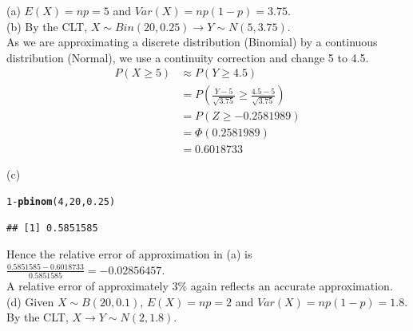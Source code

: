 \documentclass[bigtut]{tutorial}\usepackage[]{graphicx}\usepackage[]{color}
\makeatletter
\newcommand{\hlnum}[1]{\textcolor[rgb]{0.686,0.059,0.569}{#1}}%
\newcommand{\hlopt}[1]{\textcolor[rgb]{0,0,0}{#1}}%
\newcommand{\hlstd}[1]{\textcolor[rgb]{0.345,0.345,0.345}{#1}}%
\newcommand{\hlkwd}[1]{\textcolor[rgb]{0.737,0.353,0.396}{\textbf{#1}}}%
\newenvironment{kframe}{%
 \def\at@end@of@kframe{}%
 \ifinner\ifhmode%
  \def\at@end@of@kframe{\end{minipage}}%
  \begin{minipage}{\columnwidth}%
 \fi\fi%
 \def\FrameCommand##1{\hskip\@totalleftmargin \hskip-\fboxsep
 \colorbox{shadecolor}{##1}\hskip-\fboxsep
     \hskip-\linewidth \hskip-\@totalleftmargin \hskip\columnwidth}%
 \MakeFramed {\advance\hsize-\width
   \@totalleftmargin\z@ \linewidth\hsize
   \@setminipage}}%
 {\par\unskip\endMakeFramed%
 \at@end@of@kframe}
\newenvironment{knitrout}{}{} %
\makeatother
\begin{document}
\begin{tutorial}
\begin{questions}



\begin{solution}
(a)  $E(X) = np = 5$ and $Var(X)=np(1-p)=3.75$. \\

(b)
By the CLT, $X \sim Bin(20,0.25) \rightarrow Y \sim N(5,3.75)$. \\

As we are approximating a discrete distribution (Binomial) by a continuous distribution (Normal), we use a continuity correction and  change 5 to 4.5.
\begin{align*} 
P(X \geq 5) & \approx P(Y \geq 4.5) \\
& = P( \frac {Y - 5}{\sqrt{3.75}} \geq \frac{4.5-5}{\sqrt{3.75}} ) \\
& = P(Z \geq -0.2581989 ) \\
& = \Phi(0.2581989) \\
& = 0.6018733
\end{align*}

\vspace{.5cm}
(c)
\begin{knitrout}
\color{fgcolor}\begin{kframe}
\begin{alltt}
\hlnum{1}\hlopt{-}\hlkwd{pbinom}\hlstd{(}\hlnum{4}\hlstd{,}\hlnum{20}\hlstd{,}\hlnum{0.25}\hlstd{)}
\end{alltt}
\begin{verbatim}
## [1] 0.5851585
\end{verbatim}
\end{kframe}
\end{knitrout}

Hence the relative error of approximation in (a) is $\frac{0.5851585 -  0.6018733}{0.5851585} = -0.02856457$. \\
A relative error of approximately 3\% again reflects an accurate approximation. \\

(d)
Given $X\sim B(20,0.1)$, $E(X) = np = 2$ and $Var(X)=np(1-p)=1.8$. \\

By the CLT, $X \rightarrow Y \sim N(2,1.8)$. \\


\end{solution}
\end{questions}
\end{tutorial}
\end{document}
